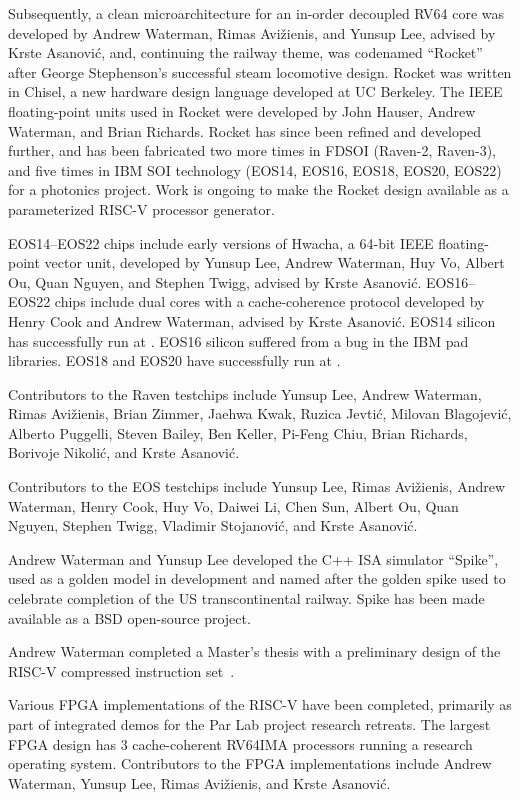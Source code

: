 Subsequently, a clean microarchitecture for an in-order decoupled RV64
core was developed by Andrew Waterman, Rimas Avi\v{z}ienis, and Yunsup
Lee, advised by Krste Asanovi\'{c}, and, continuing the railway theme,
was codenamed ``Rocket'' after George Stephenson's successful steam
locomotive design.  Rocket was written in Chisel, a new hardware
design language developed at UC Berkeley.  The IEEE floating-point
units used in Rocket were developed by John Hauser, Andrew
Waterman, and Brian Richards.
Rocket has since been refined and developed further, and has been
fabricated two more times in  FDSOI (Raven-2, Raven-3),
and five times in IBM  SOI technology (EOS14, EOS16,
EOS18, EOS20, EOS22) for a photonics project.  Work is ongoing to make
the Rocket design available as a parameterized RISC-V processor
generator.

EOS14--EOS22 chips include early versions of Hwacha, a 64-bit IEEE
floating-point vector unit, developed by Yunsup Lee, Andrew Waterman,
Huy Vo, Albert Ou, Quan Nguyen, and Stephen Twigg, advised by Krste
Asanovi\'{c}.  EOS16--EOS22 chips include dual cores with a
cache-coherence protocol developed by Henry Cook and Andrew Waterman,
advised by Krste Asanovi\'{c}.  EOS14 silicon has successfully run at
. EOS16 silicon suffered from a bug in the IBM pad
libraries.  EOS18 and EOS20 have successfully run at .

Contributors to the Raven testchips include Yunsup Lee, Andrew Waterman,
Rimas Avi\v{z}ienis, Brian Zimmer, Jaehwa Kwak, Ruzica Jevti\'{c},
Milovan Blagojevi\'{c}, Alberto Puggelli, Steven Bailey, Ben Keller,
Pi-Feng Chiu, Brian Richards, Borivoje Nikoli\'{c}, and Krste
Asanovi\'{c}.

Contributors to the EOS testchips include Yunsup Lee, Rimas
Avi\v{z}ienis, Andrew Waterman, Henry Cook, Huy Vo, Daiwei Li, Chen Sun,
Albert Ou, Quan Nguyen, Stephen Twigg, Vladimir Stojanovi\'{c}, and
Krste Asanovi\'{c}.

Andrew Waterman and Yunsup Lee developed the C++ ISA simulator
``Spike'', used as a golden model in development and named after the
golden spike used to celebrate completion of the US transcontinental
railway.  Spike has been made available as a BSD open-source project.

Andrew Waterman completed a Master's thesis with a preliminary design
of the RISC-V compressed instruction set~\cite{waterman-ms}.

Various FPGA implementations of the RISC-V have been completed,
primarily as part of integrated demos for the Par Lab project research
retreats.  The largest FPGA design has 3 cache-coherent RV64IMA
processors running a research operating system.  Contributors to the
FPGA implementations include Andrew Waterman, Yunsup Lee, Rimas
Avi\v{z}ienis, and Krste Asanovi\'{c}.

